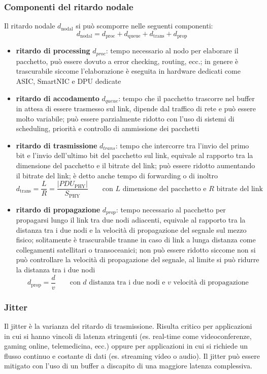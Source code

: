\subsubsection*{Componenti del ritardo nodale}
Il ritardo nodale \(d_\text{nodal}\) si può scomporre nelle seguenti componenti:
\[d_\text{nodal} = d_\text{proc} + d_\text{queue} + d_\text{trans} + d_\text{prop}\]
\begin{itemize}
	\item \textbf{ritardo di processing} \(d_{proc}\): tempo necessario al nodo per elaborare il pacchetto, può essere
	dovuto a error checking, routing, ecc.; in genere è trascurabile siccome l'elaborazione è eseguita in hardware dedicati
	come ASIC, SmartNIC e DPU dedicate
	\item \textbf{ritardo di accodamento} \(d_{queue}\): tempo che il pacchetto trascorre nel buffer in attesa di essere
	trasmesso sul link, dipende dal traffico di rete e può essere molto variabile; può essere parzialmente ridotto con
	l'uso di sistemi di scheduling, priorità e controllo di ammissione dei pacchetti
	\item \textbf{ritardo di trasmissione} \(d_{trans}\): tempo che intercorre tra l'invio del primo bit e l'invio dell'ultimo
	bit del pacchetto sul link, equivale al rapporto tra la dimensione del pacchetto e il bitrate del link; può essere
	ridotto aumentando il bitrate del link; è detto anche tempo di forwarding o di inoltro
	\[d_\text{trans} = \frac{L}{R} = \frac{|PDU_\text{PHY}|}{S_\text{PHY}} \qquad \text{con } L \text{ dimensione del pacchetto e } R \text{ bitrate del link}\]
	\item \textbf{ritardo di propagazione} \(d_{prop}\): tempo necessario al pacchetto per propagarsi lungo il link tra due
	nodi adiacenti, equivale al rapporto tra la distanza tra i due nodi e la velocità di propagazione del segnale sul mezzo
	fisico; solitamente è trascurabile tranne in caso di link a lunga distanza come collegamenti satellitari o transoceanici;
	non può essere ridotto siccome non si può controllare la velocità di propagazione del segnale, al limite si può ridurre
	la distanza tra i due nodi
	\[d_\text{prop} = \frac{d}{v} \qquad \text{con } d \text{ distanza tra i due nodi e } v \text{ velocità di propagazione}\]
\end{itemize}

\subsubsection*{Jitter}
Il jitter è la varianza del ritardo di trasmissione. Risulta critico per applicazioni in cui si hanno vincoli di latenza
stringenti (es. real-time come videoconferenze, gaming online, telemedicina, ecc.) oppure per applicazioni in cui si richiede
un flusso continuo e costante di dati (es. streaming video o audio). Il jitter può essere mitigato con l'uso di un buffer
a discapito di una maggiore latenza complessiva.

